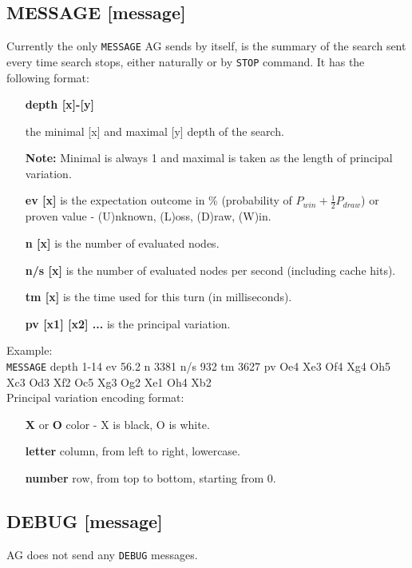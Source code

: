 \documentclass[12pt,a4paper]{article}
\begin{document}
\subsection{MESSAGE [message]}
\label{cmd_message}
Currently the only \texttt{MESSAGE} AG sends by itself, is the summary of the search sent every time search stops, either naturally or by \texttt{STOP} command. It has the following format:\\
\begin{enumerate}[leftmargin=7.5em]
\item[\textbf{depth [x]-[y]}]{the minimal [x] and maximal [y] depth of the search.

\textbf{Note:} Minimal is always 1 and maximal is taken as the length of principal variation.}
\item[\textbf{ev [x]}]{is the expectation outcome in {\%} (probability of $P_{win} + \frac{1}{2}P_{draw}$) or proven value - (U)nknown, (L)oss, (D)raw, (W)in.}
\item[\textbf{n [x]}]{is the number of evaluated nodes.}
\item[\textbf{n/s [x]}]{is the number of evaluated nodes per second (including cache hits).}
\item[\textbf{tm [x]}]{is the time used for this turn (in milliseconds).}
\item[\textbf{pv [x1] [x2] ...}]{is the principal variation.}
\end{enumerate}

Example:\\
\texttt{MESSAGE} depth 1-14 ev 56.2 n 3381 n/s 932 tm 3627 pv Oe4 Xe3 Of4 Xg4 Oh5 Xc3 Od3 Xf2 Oc5 Xg3 Og2 Xe1 Oh4 Xb2 \\

Principal variation encoding format:
\begin{enumerate}[leftmargin=7.5em]
\item[\textbf{X} or \textbf{O}]{color - X is black, O is white.}
\item[\textbf{letter}]{column, from left to right, lowercase.}
\item[\textbf{number}]{row, from top to bottom, starting from 0.}
\end{enumerate}


\subsection{DEBUG [message]}
\label{cmd_debug}
AG does not send any \texttt{DEBUG} messages.


\newpage
\end{document}
